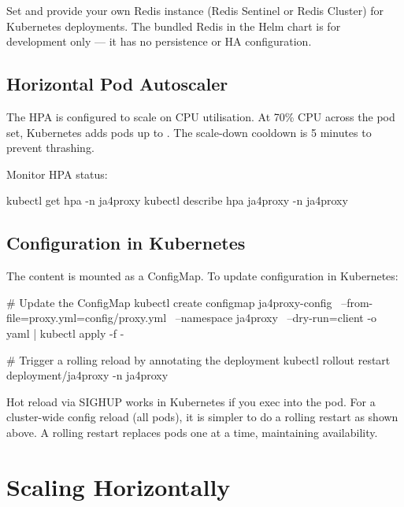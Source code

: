 \begin{notebox}
Set  and provide your own Redis instance (Redis
Sentinel or Redis Cluster) for Kubernetes deployments. The bundled Redis in the
Helm chart is for development only — it has no persistence or HA configuration.
\end{notebox}

\subsection{Horizontal Pod Autoscaler}

The HPA is configured to scale on CPU utilisation. At 70\% CPU across the pod set,
Kubernetes adds pods up to . The scale-down cooldown is
5 minutes to prevent thrashing.

Monitor HPA status:
\begin{bashcode}
kubectl get hpa -n ja4proxy
kubectl describe hpa ja4proxy -n ja4proxy
\end{bashcode}

\subsection{Configuration in Kubernetes}

The  content is mounted as a ConfigMap. To update
configuration in Kubernetes:

\begin{bashcode}
# Update the ConfigMap
kubectl create configmap ja4proxy-config \
  --from-file=proxy.yml=config/proxy.yml \
  --namespace ja4proxy \
  --dry-run=client -o yaml | kubectl apply -f -

# Trigger a rolling reload by annotating the deployment
kubectl rollout restart deployment/ja4proxy -n ja4proxy
\end{bashcode}

\begin{notebox}
Hot reload via SIGHUP works in Kubernetes if you exec into the pod. For a cluster-wide
config reload (all pods), it is simpler to do a rolling restart as shown above. A
rolling restart replaces pods one at a time, maintaining availability.
\end{notebox}

\section{Scaling Horizontally}

